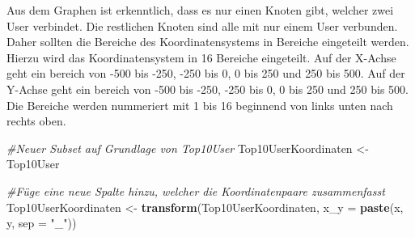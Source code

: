 \documentclass[
]{article}
\newenvironment{Shaded}{\begin{snugshade}}{\end{snugshade}}
\newcommand{\AttributeTok}[1]{\textcolor[rgb]{0.13,0.29,0.53}{#1}}
\newcommand{\CommentTok}[1]{\textcolor[rgb]{0.56,0.35,0.01}{\textit{#1}}}
\newcommand{\FunctionTok}[1]{\textcolor[rgb]{0.13,0.29,0.53}{\textbf{#1}}}
\newcommand{\NormalTok}[1]{#1}
\newcommand{\OtherTok}[1]{\textcolor[rgb]{0.56,0.35,0.01}{#1}}
\newcommand{\StringTok}[1]{\textcolor[rgb]{0.31,0.60,0.02}{#1}}
\begin{document}
Aus dem Graphen ist erkenntlich, dass es nur einen Knoten gibt, welcher
zwei User verbindet. Die restlichen Knoten sind alle mit nur einem User
verbunden. Daher sollten die Bereiche des Koordinatensystems in Bereiche
eingeteilt werden. Hierzu wird das Koordinatensystem in 16 Bereiche
eingeteilt. Auf der X-Achse geht ein bereich von -500 bis -250, -250 bis
0, 0 bis 250 und 250 bis 500. Auf der Y-Achse geht ein bereich von -500
bis -250, -250 bis 0, 0 bis 250 und 250 bis 500. Die Bereiche werden
nummeriert mit 1 bis 16 beginnend von links unten nach rechts oben.

\begin{Shaded}
\begin{Highlighting}[]
\CommentTok{\#Neuer Subset auf Grundlage von Top10User}
\NormalTok{Top10UserKoordinaten }\OtherTok{\textless{}{-}}\NormalTok{ Top10User}

\CommentTok{\#Füge eine neue Spalte hinzu, welcher die Koordinatenpaare zusammenfasst}
\NormalTok{Top10UserKoordinaten }\OtherTok{\textless{}{-}} \FunctionTok{transform}\NormalTok{(Top10UserKoordinaten, }\AttributeTok{x\_y =} \FunctionTok{paste}\NormalTok{(x, y, }\AttributeTok{sep =} \StringTok{"\_"}\NormalTok{))}


\end{Highlighting}
\end{Shaded}
\end{document}
